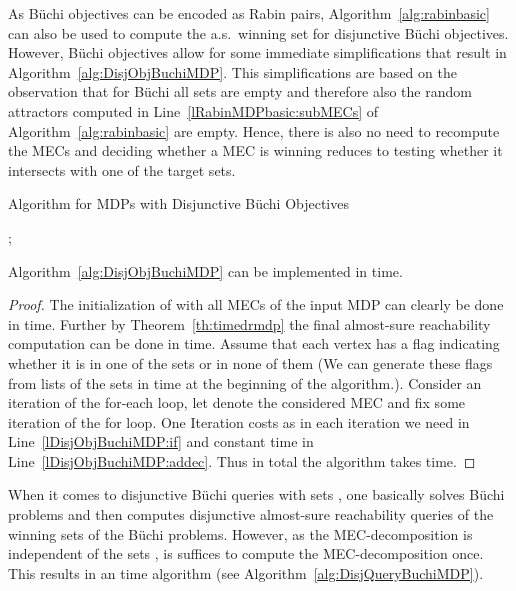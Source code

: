 \documentclass[11pt,letterpaper]{article}
\begin{document}
As Büchi objectives can be encoded as Rabin pairs, 
Algorithm~\ref{alg:rabinbasic} can also be used 
to compute the a.s.~winning set for disjunctive Büchi objectives. 
However, Büchi objectives allow for some immediate simplifications that result in Algorithm~\ref{alg:DisjObjBuchiMDP}.
This simplifications are based on the observation that for Büchi all sets  are empty and 
therefore also the random attractors computed in Line~\ref{lRabinMDPbasic:subMECs} of Algorithm~\ref{alg:rabinbasic} are empty.
Hence, there is also no need to recompute the MECs and 
deciding whether a MEC is winning reduces to testing whether it intersects with one of the target sets.

\begin{algorithm}
	\caption{Algorithm for MDPs with Disjunctive Büchi Objectives}
	\label{alg:DisjObjBuchiMDP}
	\BlankLine
	\Output
	{
	  
	}
	\BlankLine
	;
	\;
	
	\ForEach{}{
	    \If{\label{lDisjObjBuchiMDP:if}}
	    {
		  \label{lDisjObjBuchiMDP:addec}\;
	    }	    
	}
	\Return{\;}
\end{algorithm}

\begin{proposition}
	Algorithm~\ref{alg:DisjObjBuchiMDP} can be implemented in  time.
\end{proposition}
\begin{proof}
    The initialization of  with all MECs of the input
    MDP  can clearly be done in  time. Further by 
    Theorem~\ref{th:timedrmdp} the final almost-sure reachability computation
    can be done in  time. 
    Assume that each vertex has a flag indicating whether it is in one of the sets  or in none of them 
    (We can generate these flags from lists of the sets  in 
    time at the beginning of the algorithm.).
    Consider an iteration of the for-each loop, 
    let  denote the considered MEC and fix some iteration  of the for loop. 
    One Iteration costs  as in each iteration we need  in Line~\ref{lDisjObjBuchiMDP:if} 
    and constant time in Line~\ref{lDisjObjBuchiMDP:addec}.
    Thus in total the algorithm takes 
     time.
\end{proof}

When it comes to disjunctive Büchi queries with  sets ,
one basically solves  
Büchi problems and then computes disjunctive almost-sure reachability 
queries of the winning sets of the Büchi problems.
However, as the MEC-decomposition is independent of the sets ,
is suffices to compute the MEC-decomposition once. 
This results in an  
time algorithm (see Algorithm~\ref{alg:DisjQueryBuchiMDP}).
\end{document}
